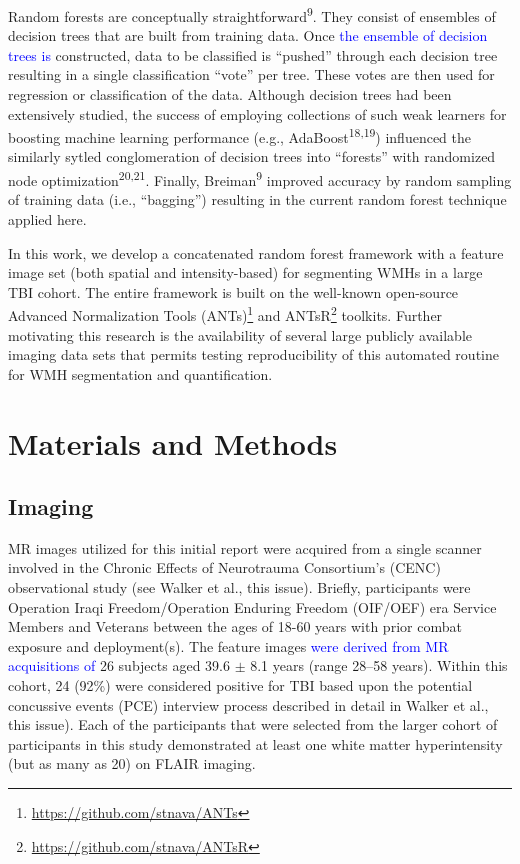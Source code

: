 \documentclass[11pt,]{article}
\let\rmarkdownfootnote\footnote%
\def\footnote{\protect\rmarkdownfootnote}
\begin{document}
Random forests are conceptually straightforward\textsuperscript{9}. They
consist of ensembles of decision trees that are built from training
data. Once \textcolor{blue}{the ensemble of decision trees is}
constructed, data to be classified is ``pushed'' through each decision
tree resulting in a single classification ``vote'' per tree. These votes
are then used for regression or classification of the data. Although
decision trees had been extensively studied, the success of employing
collections of such weak learners for boosting machine learning
performance (e.g., AdaBoost\textsuperscript{18,19}) influenced the
similarly sytled conglomeration of decision trees into ``forests'' with
randomized node optimization\textsuperscript{20,21}. Finally,
Breiman\textsuperscript{9} improved accuracy by random sampling of
training data (i.e., ``bagging'') resulting in the current random forest
technique applied here.

In this work, we develop a concatenated random forest framework with a
feature image set (both spatial and intensity-based) for segmenting WMHs
in a large TBI cohort. The entire framework is built on the well-known
open-source Advanced Normalization Tools (ANTs)\footnote{\url{https://github.com/stnava/ANTs}}
and ANTsR\footnote{\url{https://github.com/stnava/ANTsR}} toolkits.
Further motivating this research is the availability of several large
publicly available imaging data sets that permits testing
reproducibility of this automated routine for WMH segmentation and
quantification.

\section{Materials and Methods}\label{materials-and-methods}

\subsection{Imaging}\label{imaging}

MR images utilized for this initial report were acquired from a single
scanner involved in the Chronic Effects of Neurotrauma Consortium's
(CENC) observational study (see Walker et al., this issue). Briefly,
participants were Operation Iraqi Freedom/Operation Enduring Freedom
(OIF/OEF) era Service Members and Veterans between the ages of 18-60
years with prior combat exposure and deployment(s). The feature images
\textcolor{blue}{were derived from MR acquisitions of} 26 subjects aged
39.6 \(\pm\) 8.1 years (range 28--58 years). Within this cohort, 24
(92\%) were considered positive for TBI based upon the potential
concussive events (PCE) interview process described in detail in Walker
et al., this issue). Each of the participants that were selected from
the larger cohort of participants in this study demonstrated at least
one white matter hyperintensity (but as many as 20) on FLAIR imaging.
\end{document}
